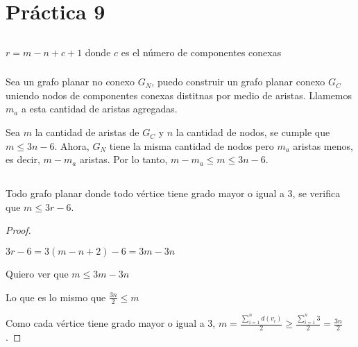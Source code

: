 \section{Práctica 9}

\setcounter{subsection}{1}
\subsection{}



\subsection{}

\subsubsection{}
$r = m - n + c + 1$ donde $c$ es el número de componentes conexas

\subsubsection{}
Sea un grafo planar no conexo $G_N$, puedo construir un grafo planar conexo $G_C$ uniendo nodos de componentes conexas distitnas por medio de aristas. Llamemos $m_a$ a esta cantidad de aristas agregadas.

Sea $m$ la cantidad de aristas de $G_C$ y $n$ la cantidad de nodos, se cumple que $m \leq 3n - 6$. Ahora, $G_N$ tiene la misma cantidad de nodos pero $m_a$ aristas menos, es decir, $m - m_a$ aristas. Por lo tanto, $m - m_a \leq m \leq 3n - 6$.

\subsection{}

\begin{lema}
    Todo grafo planar donde todo vértice tiene grado mayor o igual a 3, se verifica que $m \leq 3r - 6$.
\end{lema}

\begin{proof}
    ~

    $3r - 6 = 3(m - n + 2) - 6 = 3m - 3n$

    Quiero ver que $m \leq 3m - 3n$

    Lo que es lo mismo que $\frac{3n}{2} \leq m$

    Como cada vértice tiene grado mayor o igual a 3, $m = \frac{\sum_{i=1}^{n}d(v_i)}{2} \geq \frac{\sum_{i=1}^{n}3}{2} = \frac{3n}{2}$.
\end{proof}

